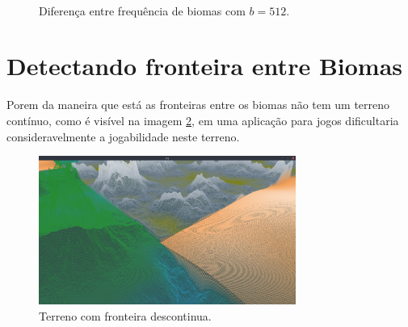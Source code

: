 \begin{figure}[H]
     \centering
     \hspace{0.1cm}
     \\
     \caption{Diferença entre frequência de biomas com $b = 512$.}
     
     \label{fig:biomeareasanotherCompx}
\end{figure}

\section{Detectando fronteira entre Biomas}

Porem da maneira que está as fronteiras entre os biomas não tem um terreno
contínuo, como é visível na imagem \ref{fig:descontinuos}, em uma aplicação para jogos
dificultaria consideravelmente
a jogabilidade neste terreno. %

\begin{figure}[H]
    \centering
    \includegraphics[width=0.75\textwidth]{figuras/descontinuos.png}
    \caption{Terreno com fronteira descontinua.}
    \label{fig:descontinuos}
\end{figure}

